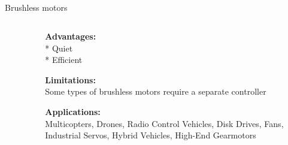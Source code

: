 \subsection{}
{
\begin{frame}{Brushless motors}

\begin{columns}
\begin{column}{0.6\textwidth}  %

	\vspace{-3mm}
   	\begin{figure}
 	\end{figure}

\end{column}

\begin{column}{0.4\textwidth}

{\bf Advantages:} \\
* Quiet \\
* Efficient 

{\bf Limitations:} \\
Some types of brushless motors require a separate controller

{\bf Applications:} \\
Multicopters, 
Drones, 
Radio Control Vehicles, 
Disk Drives,
Fans, 
Industrial Servos, 
Hybrid Vehicles, 
High-End Gearmotors


\end{column}
\end{columns}
\end{frame}
}





